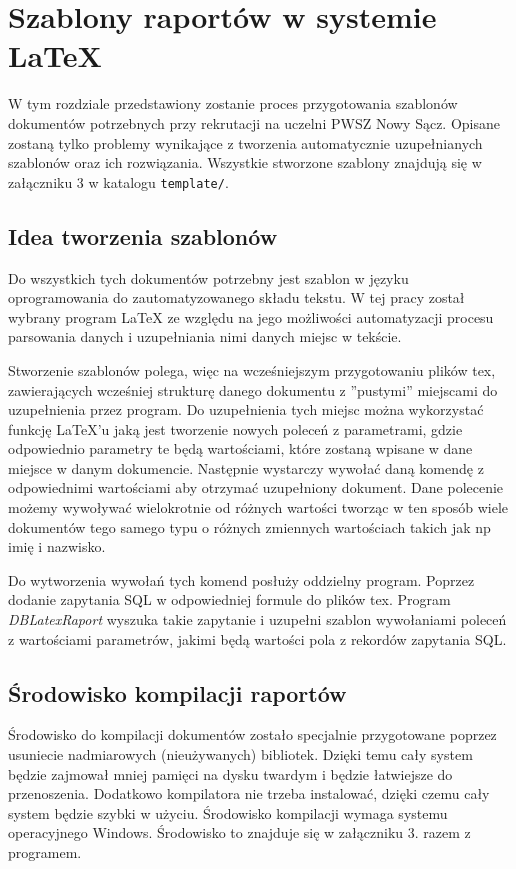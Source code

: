 \chapter{Szablony raportów w systemie LaTeX}
\label{ch:szablonyraportowwsystemielatex}

W tym rozdziale przedstawiony zostanie proces przygotowania szablonów dokumentów potrzebnych przy rekrutacji na uczelni PWSZ Nowy Sącz. Opisane zostaną tylko problemy wynikające z tworzenia automatycznie uzupełnianych szablonów oraz ich rozwiązania. Wszystkie stworzone szablony znajdują się w załączniku 3 w katalogu \texttt{template/}.

\section{Idea tworzenia szablonów}

Do wszystkich tych dokumentów potrzebny jest szablon w języku oprogramowania do zautomatyzowanego składu tekstu. W tej pracy został wybrany program LaTeX ze względu na jego możliwości automatyzacji procesu parsowania danych i uzupełniania nimi danych miejsc w tekście.
\par Stworzenie szablonów polega, więc na wcześniejszym przygotowaniu plików tex, zawierających wcześniej strukturę danego dokumentu z ''pustymi''  miejscami do uzupełnienia przez program. Do uzupełnienia tych miejsc można wykorzystać funkcję LaTeX'u jaką jest tworzenie nowych poleceń z parametrami, gdzie odpowiednio parametry te będą wartościami, które zostaną wpisane w dane miejsce w danym dokumencie. Następnie wystarczy wywołać daną komendę z odpowiednimi wartościami aby otrzymać uzupełniony dokument. Dane polecenie możemy wywoływać wielokrotnie od różnych wartości tworząc w ten sposób wiele dokumentów tego samego typu o różnych zmiennych wartościach takich jak np imię i nazwisko. 
\par Do wytworzenia wywołań tych komend posłuży oddzielny program. Poprzez dodanie zapytania SQL w odpowiedniej formule do plików tex. Program \emph{DBLatexRaport} wyszuka takie zapytanie i uzupełni szablon wywołaniami poleceń z wartościami parametrów, jakimi będą wartości pola z rekordów zapytania SQL. 

\section{Środowisko kompilacji raportów}

Środowisko do kompilacji dokumentów zostało specjalnie przygotowane poprzez usuniecie nadmiarowych (nieużywanych) bibliotek. Dzięki temu cały system będzie zajmował mniej pamięci na dysku twardym i będzie łatwiejsze do przenoszenia. Dodatkowo kompilatora nie trzeba instalować, dzięki czemu cały system będzie szybki w użyciu. Środowisko kompilacji wymaga systemu operacyjnego Windows. Środowisko to znajduje się w załączniku 3. razem z programem.


